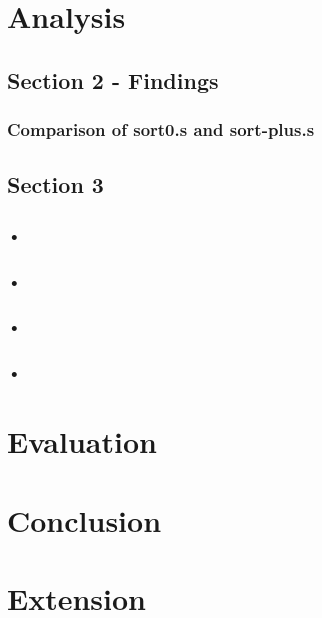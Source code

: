 \documentclass[11]{article}
\begin{document}
	\section{Analysis}
		\subsection{Section 2 - Findings}
			\subsubsection{Comparison of sort0.s and sort-plus.s}
		\subsection{Section 3}
			\subsubsection{•}
			\subsubsection{•}
			\subsubsection{•}
			\subsubsection{•}
	\section{Evaluation}
	\section{Conclusion}
	\section{Extension}
\end{document}

